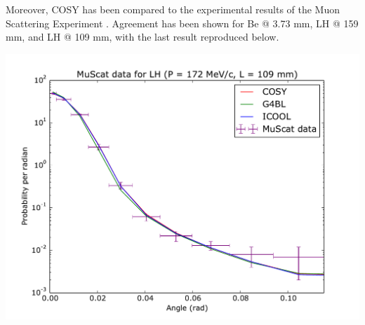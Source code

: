 \documentclass[portrait,a0paper,fontscale=0.285]{baposter} %
\begin{document}
\begin{poster}

{\tiny
\renewcommand{\section}[2]{}%
{}

}

{
Moreover, COSY has been compared to the experimental results of the Muon Scattering Experiment \cite{muscat}. Agreement has been shown for Be @ 3.73 mm, LH @ 159 mm, and LH @ 109 mm, with the last result reproduced below.

\includegraphics[width=\textwidth]{Figures/172.109.muscat.pdf}
}



\end{poster}
\end{document}
